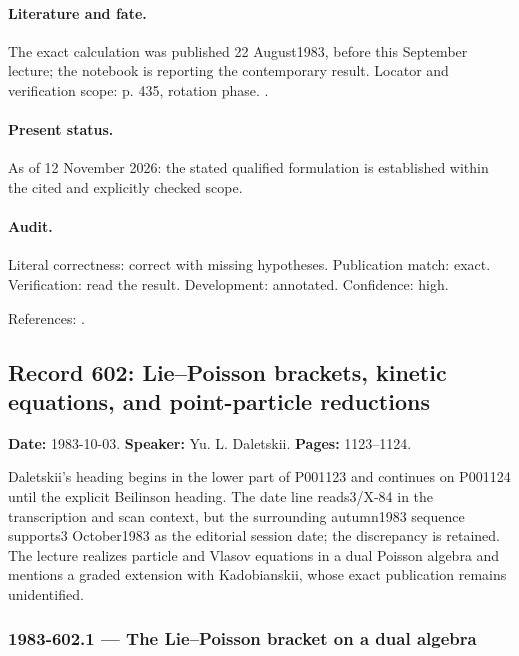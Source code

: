\paragraph{Literature and fate.} The exact calculation was published 22 August1983, before this September lecture; the notebook is reporting the contemporary result. Locator and verification scope: p. 435, rotation phase. \cite{witten1983current}.

\paragraph{Present status.} As of 12 November 2026: the stated qualified formulation is established within the cited and explicitly checked scope.

\paragraph{Audit.} Literal correctness: correct with missing hypotheses. Publication match: exact. Verification: read the result. Development: annotated. Confidence: high.

\noindent References: \citep{witten1983current}.\par

\subsection{Record 602: Lie--Poisson brackets, kinetic equations, and point-particle reductions}

\label{talk:602}

\noindent\textbf{Date:} 1983-10-03. \textbf{Speaker:} Yu. L. Daletskii. \textbf{Pages:} 1123--1124.\par

Daletskii's heading begins in the lower part of P001123 and continues on P001124 until the explicit Beilinson heading. The date line reads3/X-84 in the transcription and scan context, but the surrounding autumn1983 sequence supports3 October1983 as the editorial session date; the discrepancy is retained. The lecture realizes particle and Vlasov equations in a dual Poisson algebra and mentions a graded extension with Kadobianskii, whose exact publication remains unidentified.

\subsubsection{1983-602.1 --- The Lie--Poisson bracket on a dual algebra}

